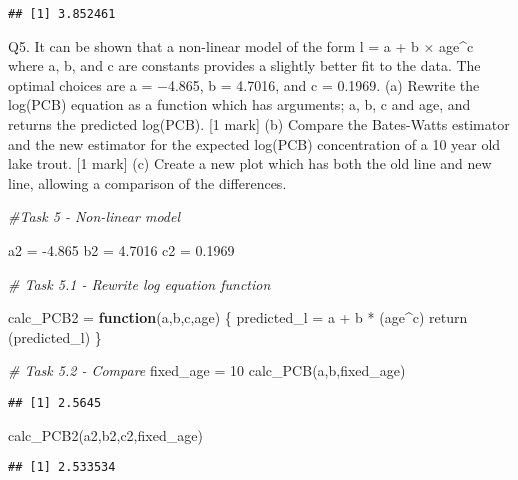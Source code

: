 \documentclass[
]{article}
\newenvironment{Shaded}{\begin{snugshade}}{\end{snugshade}}
\newcommand{\CommentTok}[1]{\textcolor[rgb]{0.56,0.35,0.01}{\textit{#1}}}
\newcommand{\ControlFlowTok}[1]{\textcolor[rgb]{0.13,0.29,0.53}{\textbf{#1}}}
\newcommand{\DecValTok}[1]{\textcolor[rgb]{0.00,0.00,0.81}{#1}}
\newcommand{\FloatTok}[1]{\textcolor[rgb]{0.00,0.00,0.81}{#1}}
\newcommand{\FunctionTok}[1]{\textcolor[rgb]{0.00,0.00,0.00}{#1}}
\newcommand{\NormalTok}[1]{#1}
\newcommand{\OtherTok}[1]{\textcolor[rgb]{0.56,0.35,0.01}{#1}}
\newcommand{\SpecialCharTok}[1]{\textcolor[rgb]{0.00,0.00,0.00}{#1}}
\begin{document}
\begin{verbatim}
## [1] 3.852461
\end{verbatim}

Q5. It can be shown that a non-linear model of the form l = a + b ×
age\^{}c where a, b, and c are constants provides a slightly better fit
to the data. The optimal choices are a = −4.865, b = 4.7016, and c =
0.1969. (a) Rewrite the log(PCB) equation as a function which has
arguments; a, b, c and age, and returns the predicted log(PCB). {[}1
mark{]} (b) Compare the Bates-Watts estimator and the new estimator for
the expected log(PCB) concentration of a 10 year old lake trout. {[}1
mark{]} (c) Create a new plot which has both the old line and new line,
allowing a comparison of the differences.

\begin{Shaded}
\begin{Highlighting}[]
\CommentTok{\#Task 5 {-} Non{-}linear model}

\NormalTok{a2 }\OtherTok{=} \SpecialCharTok{{-}}\FloatTok{4.865}
\NormalTok{b2 }\OtherTok{=} \FloatTok{4.7016}
\NormalTok{c2 }\OtherTok{=} \FloatTok{0.1969}

\CommentTok{\# Task 5.1 {-} Rewrite log equation function}

\NormalTok{calc\_PCB2 }\OtherTok{=} \ControlFlowTok{function}\NormalTok{(a,b,c,age) \{}
\NormalTok{  predicted\_l }\OtherTok{=}\NormalTok{ a }\SpecialCharTok{+}\NormalTok{ b }\SpecialCharTok{*}\NormalTok{ (age}\SpecialCharTok{\^{}}\NormalTok{c) }
  \FunctionTok{return}\NormalTok{ (predicted\_l)}
\NormalTok{\}}

\CommentTok{\# Task 5.2 {-} Compare}
\NormalTok{fixed\_age }\OtherTok{=} \DecValTok{10}
\FunctionTok{calc\_PCB}\NormalTok{(a,b,fixed\_age)}
\end{Highlighting}
\end{Shaded}

\begin{verbatim}
## [1] 2.5645
\end{verbatim}

\begin{Shaded}
\begin{Highlighting}[]
\FunctionTok{calc\_PCB2}\NormalTok{(a2,b2,c2,fixed\_age)}
\end{Highlighting}
\end{Shaded}

\begin{verbatim}
## [1] 2.533534
\end{verbatim}
\end{document}
